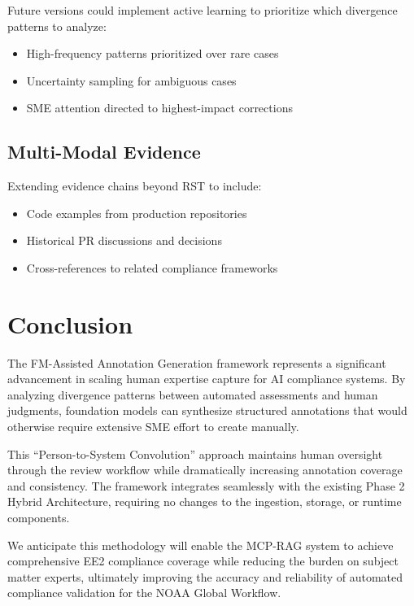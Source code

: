 \documentclass[11pt,a4paper]{article}
\begin{document}
Future versions could implement active learning to prioritize which divergence patterns to analyze:

\begin{itemize}
    \item High-frequency patterns prioritized over rare cases
    \item Uncertainty sampling for ambiguous cases
    \item SME attention directed to highest-impact corrections
\end{itemize}

\subsection{Multi-Modal Evidence}

Extending evidence chains beyond RST to include:

\begin{itemize}
    \item Code examples from production repositories
    \item Historical PR discussions and decisions
    \item Cross-references to related compliance frameworks
\end{itemize}

\section{Conclusion}

The FM-Assisted Annotation Generation framework represents a significant advancement in scaling human expertise capture for AI compliance systems. By analyzing divergence patterns between automated assessments and human judgments, foundation models can synthesize structured annotations that would otherwise require extensive SME effort to create manually.

This ``Person-to-System Convolution'' approach maintains human oversight through the review workflow while dramatically increasing annotation coverage and consistency. The framework integrates seamlessly with the existing Phase 2 Hybrid Architecture, requiring no changes to the ingestion, storage, or runtime components.

We anticipate this methodology will enable the MCP-RAG system to achieve comprehensive EE2 compliance coverage while reducing the burden on subject matter experts, ultimately improving the accuracy and reliability of automated compliance validation for the NOAA Global Workflow.
\end{document}
